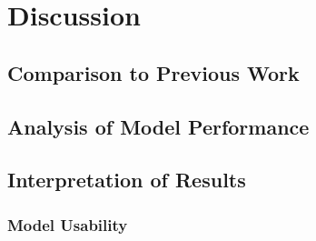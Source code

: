 \section{Discussion}


\subsection{Comparison to Previous Work}

\subsection{Analysis of Model Performance}


\subsection{Interpretation of Results}




\subsubsection{Model Usability}



